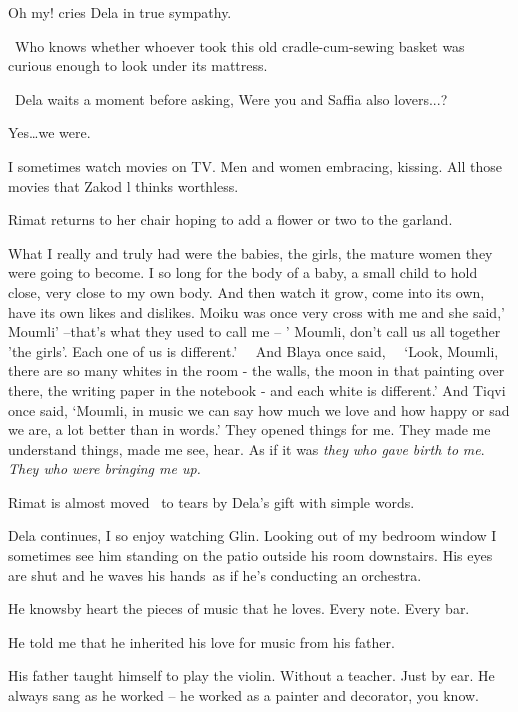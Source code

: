 \documentclass[12pt]{book}
\begin{document}
{\textquotedbl}Oh my!{\textquotedbl} cries Dela in true sympathy.

~{\textquotedbl}Who knows whether whoever took this old cradle-cum-sewing basket was curious enough to look under its
mattress.{\textquotedbl}

~Dela waits a moment before asking, {\textquotedbl}Were you and Saffia also lovers...?{\textquotedbl}

{\textquotedbl}Yes{\dots}we were.{\textquotedbl}

{\textquotedbl}I sometimes watch movies on TV. Men and women embracing, kissing. All those movies that Zakod l thinks
worthless.{\textquotedbl}

Rimat returns to her chair hoping to add a flower or two to the garland.

{\textquotedbl}What I really and truly had were the babies, the girls, the mature women they were going to become. I so
long for the body of a baby, a small child to hold close, very close to my own body. And then watch it grow, come into
its own, have its own likes and dislikes. Moiku was once very cross with me and she said,' Moumli' --that's what they
used to call me -- ' Moumli, don't call us all together 'the girls'. Each one of us is different.' \ \ And Blaya once
said, \ \ {}`Look, Moumli, there are so many whites in the room - the walls, the moon in that painting over there, the
writing paper in the notebook - and each white is different.' And Tiqvi once said, `Moumli, in music we can say how
much we love and how happy or sad we are, a lot better than in words.' They opened things for me. They made me
understand things, made me see, hear. As if it was \textit{they} \textit{who gave birth to} \textit{me}.\textit{ They
who were bringing me up.}{\textquotedbl}

Rimat is almost moved \ to tears by Dela's gift with simple words.

Dela continues, {\textquotedbl}I so enjoy watching Glin. Looking out of my bedroom window I sometimes see him standing
on the patio outside his room downstairs. His eyes are shut and he waves his hands~as if he's conducting an
orchestra.{\textquotedbl}

{\textquotedbl}He knowsby heart the pieces of music that he loves. Every note. Every bar.{\textquotedbl}

{\textquotedbl}He told me that he inherited his love for music from his father.{\textquotedbl}

{\textquotedbl}His father taught himself to play the violin. Without a teacher. Just by ear. He always sang as he worked
-- he worked as a painter and decorator, you know.{\textquotedbl}
\end{document}
